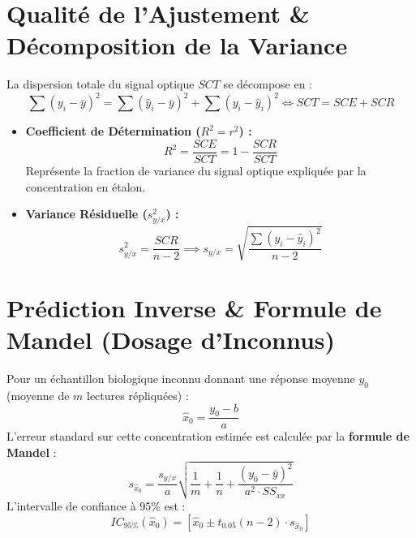 \documentclass[11pt,a4paper]{article}
\begin{document}
\section{Qualité de l'Ajustement \& Décomposition de la Variance}

La dispersion totale du signal optique $SCT$ se décompose en :
\begin{equation*}
  \sum (y_i - \bar{y})^2 = \sum (\hat{y}_i - \bar{y})^2 + \sum (y_i - \hat{y}_i)^2 \iff SCT = SCE + SCR
\end{equation*}
\begin{itemize}[leftmargin=*, label=\faCheck]
  \item \textbf{Coefficient de Détermination ($R^2 = r^2$) :} 
  \begin{equation*}
    R^2 = \frac{SCE}{SCT} = 1 - \frac{SCR}{SCT}
  \end{equation*}
  Représente la fraction de variance du signal optique expliquée par la concentration en étalon.
  \item \textbf{Variance Résiduelle ($s_{y/x}^2$) :} 
  \begin{equation*}
    s_{y/x}^2 = \frac{SCR}{n - 2} \implies s_{y/x} = \sqrt{\frac{\sum (y_i - \hat{y}_i)^2}{n - 2}}
  \end{equation*}
\end{itemize}

\section{Prédiction Inverse \& Formule de Mandel (Dosage d'Inconnus)}

Pour un échantillon biologique inconnu donnant une réponse moyenne $y_0$ (moyenne de $m$ lectures répliquées) :
\begin{equation*}
  \hat{x}_0 = \frac{y_0 - b}{a}
\end{equation*}
L'erreur standard sur cette concentration estimée est calculée par la \textbf{formule de Mandel} :
\begin{equation*}
  s_{\hat{x}_0} = \frac{s_{y/x}}{a} \sqrt{\frac{1}{m} + \frac{1}{n} + \frac{(y_0 - \bar{y})^2}{a^2 \cdot SS_{xx}}}
\end{equation*}
L'intervalle de confiance à $95\%$ est :
\begin{equation*}
  IC_{95\%}(\hat{x}_0) = \left[ \hat{x}_0 \pm t_{0.05}(n - 2) \cdot s_{\hat{x}_0} \right]
\end{equation*}
\end{document}
